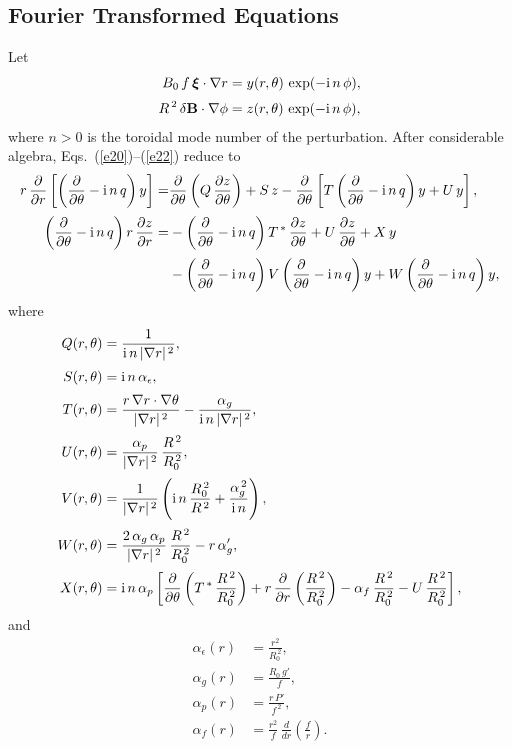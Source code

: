 \documentclass[12pt,prb,aps,notitlepage]{revtex4-1}
\newcommand {\bxi} {\mbox{\boldmath$\xi$}}
\begin{document}
\subsection{Fourier Transformed Equations}
Let
\begin{align}
B_0\,f\,\bxi\cdot\nabla r &= y(r,\theta)\,\exp(-{\rm i}\,n\,\phi),\\[0.5ex]
R^{\,2}\,\delta{\bf B}\cdot \nabla\phi &= z(r,\theta)\,\exp(-{\rm i}\,n\,\phi),
\end{align}
where $n>0$ is the toroidal mode number of the perturbation.
After considerable algebra, Eqs.~(\ref{e20})--(\ref{e22}) reduce to 
\begin{align}\label{e26}
r\,\frac{\partial}{\partial r}\left[\left(\frac{\partial}{\partial\theta}-{\rm i}\,n\,q\right)y\right]=&
\frac{\partial}{\partial\theta}\left(Q\,\frac{\partial z}{\partial\theta}\right) + S\,z -\frac{\partial}{\partial\theta}\left[T\left(\frac{\partial}{\partial\theta}-{\rm i}\,n\,q\right)y + U\,y\right],\\[0.5ex]
\left(\frac{\partial}{\partial\theta}-{\rm i}\,n\,q\right)r\,\frac{\partial z}{\partial r} =& -\left(\frac{\partial}{\partial\theta}-{\rm i}\,n\,q\right)T^{\,\ast}\,\frac{\partial z}{\partial\theta} + U\,\frac{\partial z}{\partial\theta} + X\,y
\nonumber\\[0.5ex]
&-\left(\frac{\partial}{\partial\theta}-{\rm i}\,n\,q\right)V\left(\frac{\partial}{\partial\theta}-{\rm i}\,n\,q\right)y+W\left(\frac{\partial}{\partial\theta}-{\rm i}\,n\,q\right)y,\label{e27}
\end{align}
where
\begin{align}\label{e28}
Q(r,\theta) &= \frac{1}{{\rm i}\,n\,|\nabla r|^{\,2}},\\[0.5ex]
S(r,\theta) &={\rm i}\,n\,\alpha_\epsilon,\\[0.5ex]
T(r,\theta)&= \frac{r\,\nabla r\cdot\nabla\theta}{|\nabla r|^{\,2}} - \frac{\alpha_g}{{\rm i}\,n\,|\nabla r|^{\,2}},\\[0.5ex]
U(r,\theta)&= \frac{\alpha_p}{|\nabla r|^{\,2}}\,\frac{R^{\,2}}{R_0^{\,2}},\\[0.5ex]
V(r,\theta)&= \frac{1}{|\nabla r|^{\,2}}\left({\rm i}\,n\,\frac{R_0^{\,2}}{R^{\,2}} + \frac{\alpha_g^{\,2}}{{\rm i}\,n}\right),\\[0.5ex]
W(r,\theta)&=\frac{2\,\alpha_g\,\alpha_p}{|\nabla r|^{\,2}}\,\frac{R^{\,2}}{R_0^{\,2}} - r\,\alpha_g',\\[0.5ex]
X(r,\theta) &= {\rm i}\,n\,\alpha_p\left[\frac{\partial}{\partial\theta}\left(T^{\,\ast}\,\frac{R^{\,2}}{R_0^{\,2}}\right)
+r\,\frac{\partial}{\partial r}\left(\frac{R^{\,2}}{R_0^{\,2}}\right) - \alpha_f\,\frac{R^{\,2}}{R_0^{\,2}}- U\,\frac{R^{\,2}}{R_0^{\,2}}\right],\label{e34}
\end{align}
and
\begin{align}
\alpha_\epsilon(r) &= \frac{r^2}{R_0^{\,2}},\\[0.5ex]
\alpha_g(r) &=\frac{R_0\,g'}{f},\\[0.5ex]
\alpha_p(r) &= \frac{r\,P'}{f^{\,2}},\\[0.5ex]
\alpha_f(r)&= \frac{r^2}{f}\,\frac{d}{dr}\!\left(\frac{f}{r}\right).
\end{align}
\end{document}
